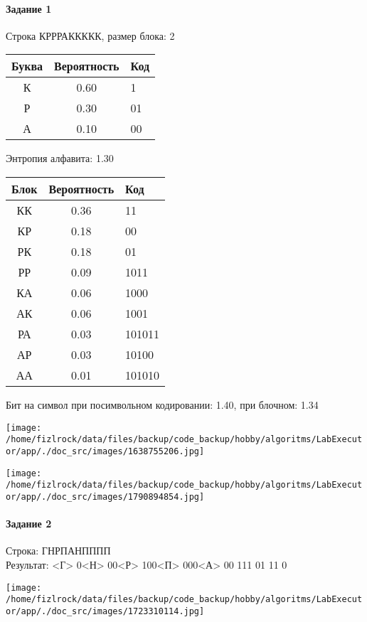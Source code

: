 \documentclass[a4paper, 12pt]{article}
\begin{document}
\paragraph{Задание 1}

Строка КРРРАККККК, размер блока: 2
\begin{center}
 \begin{tabular}{ |c|c|l| } 
  \hline
     Буква & Вероятность & Код\\ \hline
К & 0.60 & 1\\\hline
Р & 0.30 & 01\\\hline
А & 0.10 & 00
\\ \hline \end{tabular}
\end{center}
Энтропия алфавита: 1.30
\begin{center}
 \begin{tabular}{ |c|c|l| } 
  \hline
     Блок & Вероятность & Код\\ \hline
КК & 0.36 & 11\\\hline
КР & 0.18 & 00\\\hline
РК & 0.18 & 01\\\hline
РР & 0.09 & 1011\\\hline
КА & 0.06 & 1000\\\hline
АК & 0.06 & 1001\\\hline
РА & 0.03 & 101011\\\hline
АР & 0.03 & 10100\\\hline
АА & 0.01 & 101010
\\ \hline \end{tabular}
\end{center}
Бит на символ при посимвольном кодировании: 1.40, при блочном: 1.34

\texttt{[image: /home/fizlrock/data/files/backup/code\_backup/hobby/algoritms/LabExecutor/app/./doc\_src/images/1638755206.jpg]}

\texttt{[image: /home/fizlrock/data/files/backup/code\_backup/hobby/algoritms/LabExecutor/app/./doc\_src/images/1790894854.jpg]}
\pagebreak
\paragraph{Задание 2}

Строка: 
ГНРПАНПППП\\
Результат: <Г> 0<Н> 00<Р> 100<П> 000<А> 00 111 01 11 0

\texttt{[image: /home/fizlrock/data/files/backup/code\_backup/hobby/algoritms/LabExecutor/app/./doc\_src/images/1723310114.jpg]}
\end{document}
